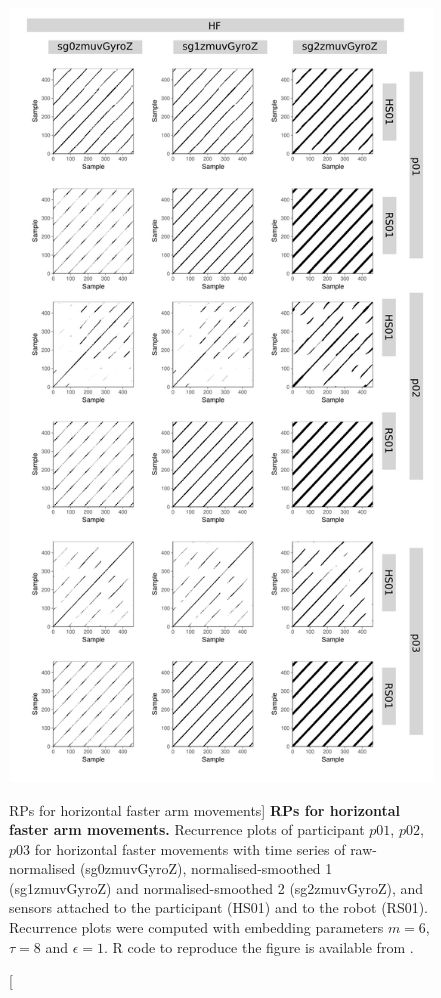 \begin{figure}
\centering
\includegraphics[height=0.80\textheight]{rp_HF}
\caption
	[RPs for horizontal faster arm movements]{
	{\bf RPs for horizontal faster arm movements.}	
	Recurrence plots %
	of participant $p01$, $p02$, $p03$ for horizontal faster
	movements with time series of raw-normalised (sg0zmuvGyroZ), 
	normalised-smoothed 1 (sg1zmuvGyroZ) and 
	normalised-smoothed 2 (sg2zmuvGyroZ), and 
	sensors attached to the participant (HS01) and to the robot (RS01).
	Recurrence plots were computed with 
	embedding parameters $m=6$, $\tau=8$ and $\epsilon=1$.
	R code to reproduce the figure is available from \cite{xochicale2018}.
        }
    \label{fig:rp_HF}
\end{figure}







